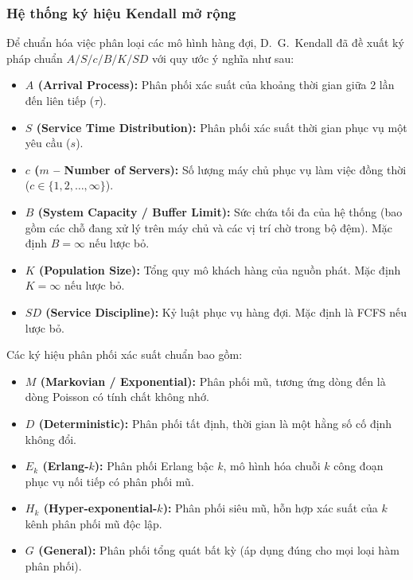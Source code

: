 \subsubsection{Hệ thống ký hiệu Kendall mở rộng}

\hspace{0.5cm}Để chuẩn hóa việc phân loại các mô hình hàng đợi, D.~G.~Kendall đã đề xuất ký pháp chuẩn $A/S/c/B/K/SD$ với quy ước ý nghĩa như sau:
\begin{itemize}[leftmargin=1.5em]
    \item \textbf{$A$ (Arrival Process):} Phân phối xác suất của khoảng thời gian giữa 2 lần đến liên tiếp ($\tau$).
    \item \textbf{$S$ (Service Time Distribution):} Phân phối xác suất thời gian phục vụ một yêu cầu ($s$).
    \item \textbf{$c$ ($m$ -- Number of Servers):} Số lượng máy chủ phục vụ làm việc đồng thời ($c \in \{1, 2, \dots, \infty\}$).
    \item \textbf{$B$ (System Capacity / Buffer Limit):} Sức chứa tối đa của hệ thống (bao gồm các chỗ đang xử lý trên máy chủ và các vị trí chờ trong bộ đệm). Mặc định $B = \infty$ nếu lược bỏ.
    \item \textbf{$K$ (Population Size):} Tổng quy mô khách hàng của nguồn phát. Mặc định $K = \infty$ nếu lược bỏ.
    \item \textbf{$SD$ (Service Discipline):} Kỷ luật phục vụ hàng đợi. Mặc định là FCFS nếu lược bỏ.
\end{itemize}

Các ký hiệu phân phối xác suất chuẩn bao gồm:
\begin{itemize}[leftmargin=1.5em]
    \item \textbf{$M$ (Markovian / Exponential):} Phân phối mũ, tương ứng dòng đến là dòng Poisson có tính chất không nhớ.
    \item \textbf{$D$ (Deterministic):} Phân phối tất định, thời gian là một hằng số cố định không đổi.
    \item \textbf{$E_k$ (Erlang-$k$):} Phân phối Erlang bậc $k$, mô hình hóa chuỗi $k$ công đoạn phục vụ nối tiếp có phân phối mũ.
    \item \textbf{$H_k$ (Hyper-exponential-$k$):} Phân phối siêu mũ, hỗn hợp xác suất của $k$ kênh phân phối mũ độc lập.
    \item \textbf{$G$ (General):} Phân phối tổng quát bất kỳ (áp dụng đúng cho mọi loại hàm phân phối).
\end{itemize}

